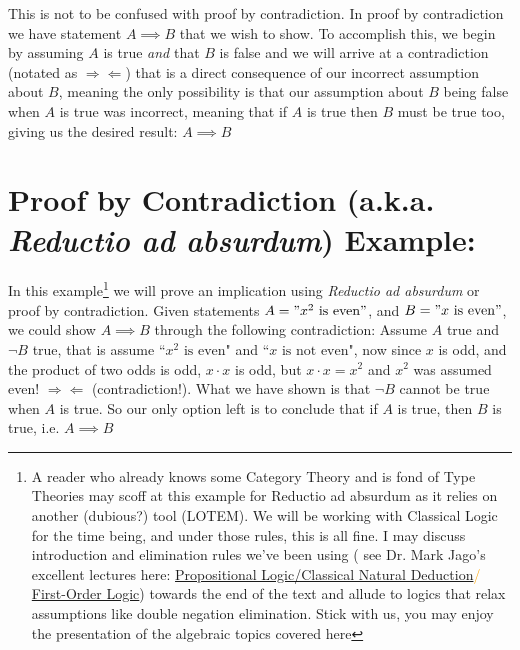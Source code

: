 \noindent This is not to be confused with proof by contradiction. In proof by contradiction we have statement $A\implies B$ that we wish to show. To accomplish this, we begin by assuming $A$ is true \textit{and} that $B$ is false and we will arrive at a contradiction (notated as $\Rightarrow\Leftarrow$) that is a direct consequence of our incorrect assumption about $B$, meaning the only possibility is that our assumption about $B$ being false when $A$ is true was incorrect, meaning that if $A$ is true then $B$ must be true too, giving us the desired result: $A \implies B$ 
\newpage
\noindent\section{Proof by Contradiction (a.k.a. 
\textit{Reductio ad absurdum}) Example:} In this example\footnote{ A reader who already knows some Category Theory and is fond of Type Theories may scoff at this example for Reductio ad absurdum as it relies on another (dubious?) tool (LOTEM). We will be working with Classical Logic for the time being, and under those rules, this is all fine. I may discuss introduction and elimination rules we've been using ( see Dr. Mark Jago's excellent lectures here: \textcolor{orange}{\href{https://www.youtube.com/watch?v=dlUkeN7KqVA&t=8s}{Propositional Logic/Classical Natural Deduction}/ \href{https://www.youtube.com/watch?v=C30w5vZypXE}{First-Order Logic}}) towards the end of the text and allude to logics that relax assumptions like double negation elimination. Stick with us, you may enjoy the presentation of the algebraic topics covered here \smiley } we will prove an implication using \textit{Reductio ad absurdum} or proof by contradiction. Given statements $A= "x^2 \text{ is even}"$, and $B= "x \text{ is even}"$, we could show $A\implies B$ through the following contradiction: Assume $A$ true and $\lnot B$ true, that is assume ``$x^2 \text{ is even}$" and ``$x \text{ is not even}$", now since $x$ is odd, and the product of two odds is odd, $x\cdot x$ is odd, but $x\cdot x=x^2$ and $x^2$ was assumed even! $\Rightarrow\Leftarrow$ (contradiction!). What we have shown is that $\lnot B$ cannot be true when $A$ is true. So our only option left is to conclude that if $A$ is true, then $B$ is true, i.e. $A\implies B$

